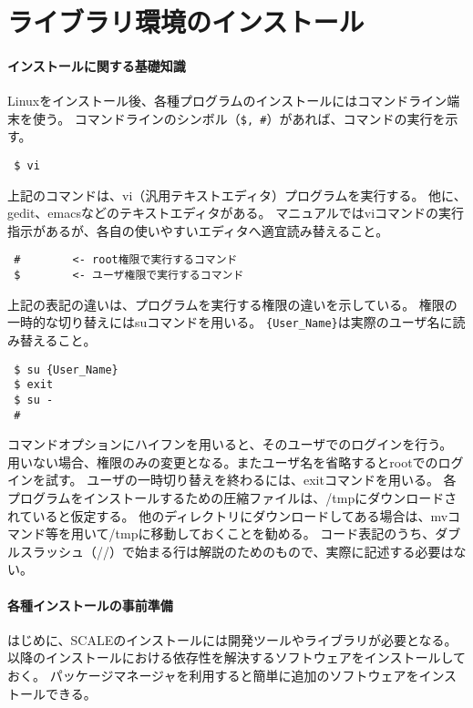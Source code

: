 \chapter{ライブラリ環境のインストール}
\label{sec:env_setting}

\subsubsection{インストールに関する基礎知識}

Linuxをインストール後、各種プログラムのインストールにはコマンドライン端末を使う。
コマンドラインのシンボル（\verb|$, #|）があれば、コマンドの実行を示す。

\begin{verbatim}
 $ vi
\end{verbatim}

上記のコマンドは、vi（汎用テキストエディタ）プログラムを実行する。
他に、gedit、emacsなどのテキストエディタがある。
マニュアルではviコマンドの実行指示があるが、各自の使いやすいエディタへ適宜読み替えること。

\begin{verbatim}
 #        <- root権限で実行するコマンド
 $        <- ユーザ権限で実行するコマンド
\end{verbatim}

上記の表記の違いは、プログラムを実行する権限の違いを示している。
権限の一時的な切り替えにはsuコマンドを用いる。
\verb|{User_Name}|は実際のユーザ名に読み替えること。

\begin{verbatim}
 $ su {User_Name}
 $ exit
 $ su -
 #
\end{verbatim}

コマンドオプションにハイフンを用いると、そのユーザでのログインを行う。
用いない場合、権限のみの変更となる。またユーザ名を省略するとrootでのログインを試す。
ユーザの一時切り替えを終わるには、exitコマンドを用いる。
各プログラムをインストールするための圧縮ファイルは、/tmpにダウンロードされていると仮定する。
他のディレクトリにダウンロードしてある場合は、mvコマンド等を用いて/tmpに移動しておくことを勧める。
コード表記のうち、ダブルスラッシュ（//）で始まる行は解説のためのもので、実際に記述する必要はない。

\subsubsection{各種インストールの事前準備}

はじめに、SCALEのインストールには開発ツールやライブラリが必要となる。
以降のインストールにおける依存性を解決するソフトウェアをインストールしておく。
パッケージマネージャを利用すると簡単に追加のソフトウェアをインストールできる。

